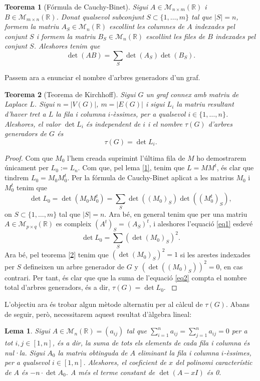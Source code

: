 \documentclass{article}
\newtheorem{theorem}{Teorema}[section]
\newtheorem{lemma}{Lema}[section]
\begin{document}
    \begin{theorem}[Fórmula de Cauchy-Binet]
    Sigui $A\in\mathcal{M}_{n\times m}(\mathbb{R})$ i $B\in\mathcal{M}_{m\times n}(\mathbb{R})$. Donat qualsevol subconjunt $S\subset\{1,\ldots,m\}$ tal que $|S|=n$, formem la matriu $A_S\in\mathcal{M}_n(\mathbb{R})$ escollint les columnes de $A$ indexades pel conjunt $S$ i formem la matriu $B_S\in\mathcal{M}_n(\mathbb{R})$ escollint les files de $B$ indexades pel conjunt $S$. Aleshores tenim que $$\det(AB)=\sum_S\det(A_S)\det(B_S).$$
    \end{theorem}
    Passem ara a enunciar el nombre d'arbres generadors d'un graf.
    \begin{theorem}[Teorema de Kirchhoff]
    Sigui $G$ un graf connex amb matriu de Laplace $L$. Sigui $n=|V(G)|$, $m=|E(G)|$ i sigui $L_i$ la matriu resultant d'haver tret a $L$ la fila i columna $i$-èssimes, per a qualsevol $i\in\{1,\ldots,n\}$. Aleshores, el valor $\det L_i$ és independent de $i$ i el nombre $\tau(G)$ d'arbres generadors de $G$ és $$\tau(G)=\det L_i.$$
    \end{theorem}
    \begin{proof}
    Com que $M_0$ l'hem creada suprimint l'última fila de $M$ ho demostrarem únicament per $L_0:=L_n$. Com que, pel lema \ref{1}, tenim que $L=MM^t$, és clar que tindrem $L_0=M_0M_0^t$.
    Per la fórmula de Cauchy-Binet aplicat a les matrius $M_0$ i $M_0^t$ tenim que \begin{equation}
        \det L_0=\det(M_0M_0^t)=\sum_S\det((M_0)_S)\det((M_0^t)_S),
        \label{eq1}
    \end{equation} on $S\subset\{1,\ldots,m\}$ tal que $|S|=n$. Ara bé, en general tenim que per una matriu $A\in\mathcal{M}_{p\times q}(\mathbb{R})$ es compleix $(A^t)_S=(A_S)^t$, i aleshores l'equació \ref{eq1} esdevé 
    \begin{equation}
        \det L_0=\sum_S(\det(M_0)_S)^2.
        \label{eq2}
    \end{equation}
    Ara bé, pel teorema \ref{2} tenim que $(\det(M_0)_S)^2=1$ si les arestes indexades per $S$ defineixen un arbre generador de $G$ y $(\det((M_0)_S))^2=0$, en cas contrari. Per tant, és clar que que la suma de l'equació \ref{eq2} compta el nombre total d'arbres generadors, és a dir, $\tau(G)=\det L_0$. \cite{2}
    \end{proof}
    L'objectiu ara és trobar algun mètode alternatiu per al càlcul de $\tau(G)$. Abans de seguir, però, necessitarem aquest resultat d'àlgebra lineal:
    \begin{lemma}\label{3}
    Sigui $A\in\mathcal{M}_n(\mathbb{R})=(a_{ij})$ tal que $\displaystyle\sum_{i=1}^na_{ij}=\sum_{j=1}^na_{ij}=0$ per a tot $i,j\in[1,n]$, és a dir, la suma de tots els elements de cada fila i columna és nul·la. Sigui $A_0$ la matriu obtinguda de $A$ eliminant la fila i columna $i$-èssimes, per a qualsevol $i\in[1,n]$. Aleshores, el coeficient de $x$ del polinomi característic de $A$ és $-n\cdot\det A_0$. A més el terme constant de $\det(A-xI)$ és 0.
    \end{lemma}
\end{document}
